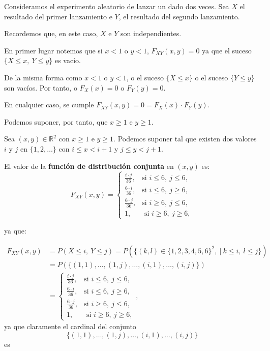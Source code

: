 \documentclass[
  letterpaper,
  DIV=11,
  numbers=noendperiod]{scrreprt}
\begin{document}
Consideramos el experimento aleatorio de lanzar un dado dos veces. Sea
\(X\) el resultado del primer lanzamiento e \(Y\), el resultado del
segundo lanzamiento.

Recordemos que, en este caso, \(X\) e \(Y\) son independientes.

En primer lugar notemos que si \(x<1\) o \(y<1\), \(F_{XY}(x,y)=0\) ya
que el suceso \(\{X\leq x,\ Y\leq y\}\) es vacío.

De la misma forma como \(x<1\) o \(y<1\), o el suceso \(\{X\leq x\}\) o
el suceso \(\{Y\leq y\}\) son vacíos. Por tanto, o \(F_X(x)=0\) o
\(F_Y(y)=0\).

En cualquier caso, se cumple \(F_{XY}(x,y)=0=F_X(x)\cdot F_Y(y)\).

Podemos suponer, por tanto, que \(x\geq 1\) e \(y\geq 1\).

Sea \((x,y)\in \mathbb{R}^2\) con \(x\geq 1\) e \(y\geq 1\). Podemos
suponer tal que existen dos valores \(i\) y \(j\) en \(\{1,2,\ldots\}\)
con \(i\leq x < i+1\) y \(j\leq y <j+1\).

El valor de la \textbf{función de distribución conjunta} en \((x,y)\)
es: \[
F_{XY}(x,y)=\begin{cases}
\frac{i\cdot j}{36}, & \mbox{si }i\leq 6, \ j\leq 6, \\
\frac{6 \cdot i}{36}, & \mbox{si }i\leq 6,\ j\geq 6,\\
\frac{6\cdot j}{36}, & \mbox{si }i\geq 6,\ j\leq 6,\\
1, & \mbox{ si }i\geq 6,\ j\geq 6,
\end{cases}
\]

ya que:

\[
\begin{array}{rl}
F_{XY}(x,y) & =P(X\leq i,\ Y\leq j)=P(\{(k,l)\in \{1,2,3,4,5,6\}^2,\ |\ k\leq i,\ l\leq j\})\\ & =P(\{(1,1),\ldots,(1,j),\ldots,(i,1),\ldots,(i,j)\})
\\
& =\begin{cases}
\frac{i\cdot j}{36}, & \mbox{si }i\leq 6, \ j\leq 6, \\
\frac{6\cdot i}{36}, & \mbox{si }i\leq 6,\ j\geq 6,\\
\frac{6\cdot j}{36}, & \mbox{si }i\geq 6,\ j\leq 6,\\
1, & \mbox{ si }i\geq 6,\ j\geq 6,
\end{cases},
\end{array}
\] ya que claramente el cardinal del conjunto
\[\{(1,1),\ldots,(1,j),\ldots,(i,1),\ldots,(i,j)\}\] es
\end{document}
